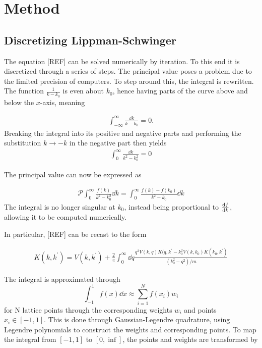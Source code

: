 \section{Method}\label{sec:Method}

\subsection{Discretizing Lippman-Schwinger}
\label{sec:discret}

The equation [REF] can be solved numerically by iteration. To this end it is
discretized through a series of steps. The principal value poses a problem due to the limited precision of computers.
To step around this, the integral is rewritten. The function
\(\frac{1}{k-k_{0}}\) is even about \(k_{0}\), hence having parts of the curve
above and below the \(x\)-axis, meaning

\begin{align*}
  \int_{-\infty}^{\infty}\frac{\dd k}{k-k_{0}} = 0.
\end{align*}
Breaking the integral into its positive and negative parts and performing the
substitution \(k\to -k\) in the negative part then yields
\begin{align*}
  \int_{0}^{\infty}\frac{\dd k}{k^{2}-k_{0}^{2}} = 0
\end{align*}

The principal value can now be expressed as

\begin{align*}
  \mathcal{P}\int_{0}^{\infty}\frac{f(k)}{k^{2}-k_{0}^{2}} \dd k = \int_{0}^{\infty}\frac{f(k)-f(k_{0})}{k^{2}-k_{0}}\dd k
\end{align*}
The integral is no longer singular at \(k_{0}\), instead being proportional to
\(\dv{f}{k}\), allowing it to be computed numerically.

In particular, [REF] can be recast to the form

\begin{align*}
  K(k, k^{\prime}) = V(k, k^{\prime}) + \frac{2}{\pi}\int_{0}^{\infty}
  \dd q \frac{q^{2}V(k,q)K(q,k^{\prime} - k^{2}_{0}V(k, k_{0})K(k_{0},k^{\prime})}{(k_{0}^{2}-q^{2})/m}
\end{align*}

The integral is approximated through
\begin{equation*}
  \int_{-1}^{1}f(x)\dd x \approx \sum_{i=1}^{N}f(x_{i})w_{i}
\end{equation*}
for N lattice points through the corresponding weights \(w_{i}\) and points
\(x_{i}\in [-1, 1]\). This is done through Gaussian-Legendre quadrature, using
Legendre polynomials to construct the weights and corresponding points. To map
the integral from \([-1, 1]\) to \([0, \inf]\), the points and weights are
transformed by

